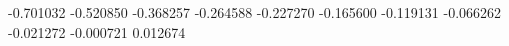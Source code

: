 -0.701032
-0.520850
-0.368257
-0.264588
-0.227270
-0.165600
-0.119131
-0.066262
-0.021272
-0.000721
0.012674
